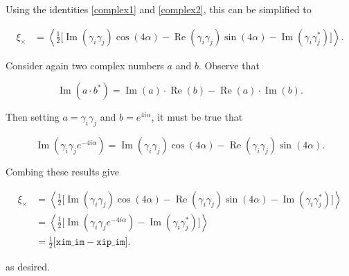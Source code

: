 \documentclass[%
 reprint,
 amsmath,amssymb,
 aps,nofootinbib
]{revtex4-1}
\begin{document}
Using the identities \eqref{complex1} and \eqref{complex2}, this can be simplified to

\begin{align*}
\xi_\times&=\left<\frac{1}{2}\big[\operatorname{Im}(\gamma_i\gamma_j)\cos(4\alpha)-\operatorname{Re}(\gamma_i\gamma_j)\sin(4\alpha)-\operatorname{Im}(\gamma_i\gamma_j^*)\big]\right>.
\end{align*}

Consider again two complex numbers $a$ and $b$. Observe that

$$\operatorname{Im}(a\cdot b^*)=\operatorname{Im}(a)\cdot\operatorname{Re}(b)-\operatorname{Re}(a)\cdot\operatorname{Im}(b).$$

Then setting $a=\gamma_i\gamma_j$ and $b=e^{4i\alpha}$, it must be true that

$$\operatorname{Im}\left(\gamma_i\gamma_je^{-4i\alpha}\right)=\operatorname{Im}(\gamma_i\gamma_j)\cos(4\alpha)-\operatorname{Re}(\gamma_i\gamma_j)\sin(4\alpha).$$

Combing these results give

\begin{align*}
\xi_\times&=\left<\frac{1}{2}\big[\operatorname{Im}(\gamma_i\gamma_j)\cos(4\alpha)-\operatorname{Re}(\gamma_i\gamma_j)\sin(4\alpha)-\operatorname{Im}(\gamma_i\gamma_j^*)\big]\right>\\
&=\left<\frac{1}{2}\big[\operatorname{Im}\left(\gamma_i\gamma_je^{-4i\alpha}\right)-\operatorname{Im}(\gamma_i\gamma_j^*)\big]\right>\\
&=\frac{1}{2}\big[\texttt{xim\_im}-\texttt{xip\_im}\big].
\end{align*}

as desired.
\end{document}
